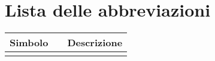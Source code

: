 

\fancyhf{}
\thispagestyle{plain}

\chapter[Lista delle abbreviazioni]{\centering Lista delle abbreviazioni}
\fontsize{14}{14}\selectfont
\doublespacing

\begin{center}
\centering
\setlength{\tabcolsep}{15pt}
\fontsize{12}{12}\selectfont
\begin{tabular}{ c c c }
\multicolumn{1}{c}{\Large \textbf{Simbolo}} & & \multicolumn{1}{c}{\Large \textbf{Descrizione}}\\
\hline\hline\\


\end{tabular}
\end{center}
